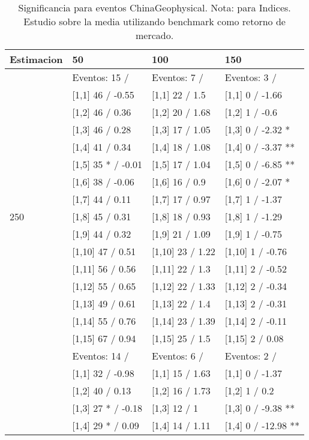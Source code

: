 \begin{table}

\caption{Significancia para eventos ChinaGeophysical. Nota: para Indices. Estudio sobre la media utilizando benchmark como retorno de mercado.}
\centering
\begin{tabular}[t]{llll}
\toprule
Estimacion & 50 & 100 & 150\\
\midrule
 & Eventos:  15 / & Eventos:  7 / & Eventos:  3 /\\
 & {}[1,1] 46  / -0.55 & {}[1,1] 22  / 1.5 & {}[1,1] 0  / -1.66\\
 & {}[1,2] 46  / 0.36 & {}[1,2] 20  / 1.68 & {}[1,2] 1  / -0.6\\
 & {}[1,3] 46  / 0.28 & {}[1,3] 17  / 1.05 & {}[1,3] 0  / -2.32 *\\
 & {}[1,4] 41  / 0.34 & {}[1,4] 18  / 1.08 & {}[1,4] 0  / -3.37 **\\
\addlinespace
 & {}[1,5] 35 * / -0.01 & {}[1,5] 17  / 1.04 & {}[1,5] 0  / -6.85 **\\
 & {}[1,6] 38  / -0.06 & {}[1,6] 16  / 0.9 & {}[1,6] 0  / -2.07 *\\
 & {}[1,7] 44  / 0.11 & {}[1,7] 17  / 0.97 & {}[1,7] 1  / -1.37\\
250 & {}[1,8] 45  / 0.31 & {}[1,8] 18  / 0.93 & {}[1,8] 1  / -1.29\\
 & {}[1,9] 44  / 0.32 & {}[1,9] 21  / 1.09 & {}[1,9] 1  / -0.75\\
\addlinespace
 & {}[1,10] 47  / 0.51 & {}[1,10] 23  / 1.22 & {}[1,10] 1  / -0.76\\
 & {}[1,11] 56  / 0.56 & {}[1,11] 22  / 1.3 & {}[1,11] 2  / -0.52\\
 & {}[1,12] 55  / 0.65 & {}[1,12] 22  / 1.33 & {}[1,12] 2  / -0.34\\
 & {}[1,13] 49  / 0.61 & {}[1,13] 22  / 1.4 & {}[1,13] 2  / -0.31\\
 & {}[1,14] 55  / 0.76 & {}[1,14] 23  / 1.39 & {}[1,14] 2  / -0.11\\
\addlinespace
 & {}[1,15] 67  / 0.94 & {}[1,15] 25  / 1.5 & {}[1,15] 2  / 0.08\\
 & Eventos:  14 / & Eventos:  6 / & Eventos:  2 /\\
 & {}[1,1] 32  / -0.98 & {}[1,1] 15  / 1.63 & {}[1,1] 0  / -1.37\\
 & {}[1,2] 40  / 0.13 & {}[1,2] 16  / 1.73 & {}[1,2] 1  / 0.2\\
 & {}[1,3] 27 * / -0.18 & {}[1,3] 12  / 1 & {}[1,3] 0  / -9.38 **\\
\addlinespace
 & {}[1,4] 29 * / 0.09 & {}[1,4] 14  / 1.11 & {}[1,4] 0  / -12.98 **\\

\end{tabular}
\end{table}
